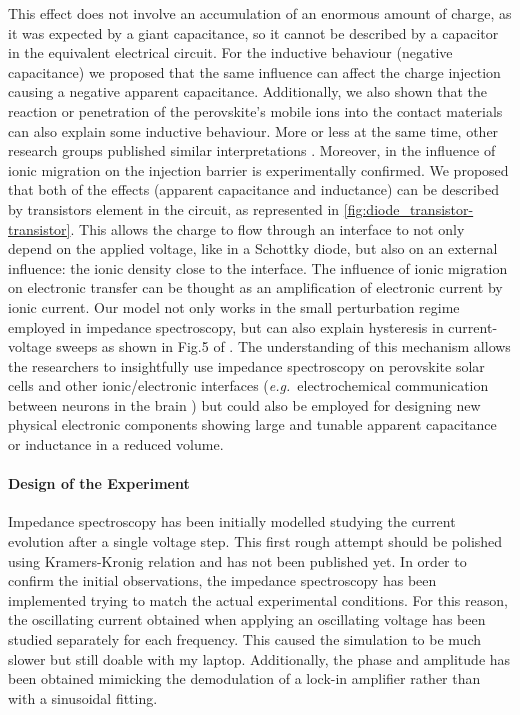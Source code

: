 	This effect does not involve an accumulation of an enormous amount of charge, as it was expected by a giant capacitance, so it cannot be described by a capacitor in the equivalent electrical circuit.
	For the inductive behaviour (negative capacitance) we proposed that the same influence can affect the charge injection causing a negative apparent capacitance.
	Additionally, we also shown that the reaction or penetration of the perovskite's mobile ions into the contact materials can also explain some inductive behaviour.
	More or less at the same time, other research groups published similar interpretations \cite{Jacobs2018,Ebadi2019}.
	Moreover, in  the influence of ionic migration on the injection barrier is experimentally confirmed.
	We proposed that both of the effects (apparent capacitance and inductance) can be described by transistors element in the circuit, as represented in \cref{fig:diode_transistor-transistor}.
	This allows the charge to flow through an interface to not only depend on the applied voltage, like in a Schottky diode, but also on an external influence: the ionic density close to the interface.
	The influence of ionic migration on electronic transfer can be thought as an amplification of electronic current by ionic current.
	Our model not only works in the small perturbation regime employed in impedance spectroscopy, but can also explain hysteresis in current\hyp{}voltage sweeps as shown in Fig.5 of .
	The understanding of this mechanism allows the researchers to insightfully use impedance spectroscopy on perovskite solar cells and other ionic/\-electronic interfaces (\textsl{e.g.}\ electrochemical communication between neurons in the brain \cite{Cole1956}) but could also be employed for designing new physical electronic components showing large and tunable apparent capacitance or inductance in a reduced volume.

	\paragraph{Design of the Experiment}
	Impedance spectroscopy has been initially modelled studying the current evolution after a single voltage step.
	This first rough attempt should be polished using Kramers\hyp{}Kronig relation and has not been published yet.
	In order to confirm the initial observations, the impedance spectroscopy has been implemented trying to match the actual experimental conditions.
	For this reason, the oscillating current obtained when applying an oscillating voltage has been studied separately for each frequency.
	This caused the simulation to be much slower but still doable with my laptop.
	Additionally, the phase and amplitude has been obtained mimicking the demodulation of a lock-in amplifier rather than with a sinusoidal fitting.

